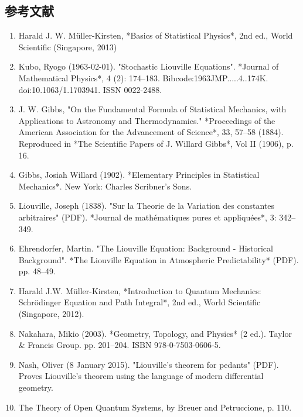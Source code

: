 \subsection{参考文献}  
\begin{enumerate}
\item Harald J. W. Müller-Kirsten, *Basics of Statistical Physics*, 2nd ed., World Scientific (Singapore, 2013)  
\item Kubo, Ryogo (1963-02-01). "Stochastic Liouville Equations". *Journal of Mathematical Physics*, 4 (2): 174–183. Bibcode:1963JMP.....4..174K. doi:10.1063/1.1703941. ISSN 0022-2488.  
\item J. W. Gibbs, "On the Fundamental Formula of Statistical Mechanics, with Applications to Astronomy and Thermodynamics." *Proceedings of the American Association for the Advancement of Science*, 33, 57–58 (1884). Reproduced in *The Scientific Papers of J. Willard Gibbs*, Vol II (1906), p. 16.  
\item Gibbs, Josiah Willard (1902). *Elementary Principles in Statistical Mechanics*. New York: Charles Scribner's Sons.  
\item Liouville, Joseph (1838). "Sur la Theorie de la Variation des constantes arbitraires" (PDF). *Journal de mathématiques pures et appliquées*, 3: 342–349.  
\item Ehrendorfer, Martin. "The Liouville Equation: Background - Historical Background". *The Liouville Equation in Atmospheric Predictability* (PDF). pp. 48–49.  
\item Harald J.W. Müller-Kirsten, *Introduction to Quantum Mechanics: Schrödinger Equation and Path Integral*, 2nd ed., World Scientific (Singapore, 2012).  
\item Nakahara, Mikio (2003). *Geometry, Topology, and Physics* (2 ed.). Taylor & Francis Group. pp. 201–204. ISBN 978-0-7503-0606-5.  
\item Nash, Oliver (8 January 2015). "Liouville's theorem for pedants" (PDF). Proves Liouville's theorem using the language of modern differential geometry.  
\item The Theory of Open Quantum Systems, by Breuer and Petruccione, p. 110.
\end{enumerate}
